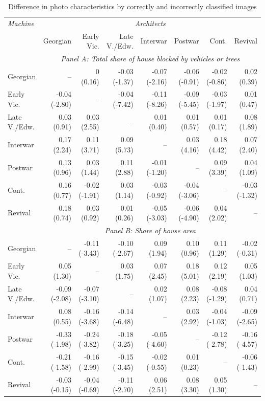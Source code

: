 \documentclass[]{article}
\begin{document}
\begin{table}[!htb] 
\caption{Difference in photo characteristics by correctly and incorrectly classified images} 
\label{tab:diffimgchar} 
\centering 
\begingroup\scriptsize 
\begin{tabular}{lrrrrrrr}

\toprule 

\emph{Machine} & \multicolumn{7}{c}{\emph{Architects}} \\ 
  \cmidrule(lr){2-8} 
& Georgian & Early Vic. & Late V./Edw. & Interwar & Postwar & Cont. & Revival \\  

 \cmidrule(lr){2-8} 
 & \multicolumn{7}{c}{\emph{ Panel A: Total share of house blocked by vehicles or trees}}\\ 
\cmidrule(lr){1-1} \cmidrule(lr){2-8} 

Georgian &  -- &  0 (0.16) & -0.03 (-1.37) & -0.07 (-2.16) & -0.06 (-0.91) & -0.02 (-0.86) &  0.02 (0.39) \\  
  Early Vic. & -0.04 (-2.80) &  -- & -0.04 (-7.42) & -0.11 (-8.26) & -0.09 (-5.45) & -0.03 (-1.97) &  0.01 (0.47) \\  
  Late V./Edw. &  0.03 (0.91) &  0.03 (2.55) &  -- &  0.01 (0.40) &  0.01 (0.57) &  0.01 (0.17) &  0.08 (1.89) \\  
  Interwar &  0.17 (2.24) &  0.11 (3.71) &  0.09 (5.73) &  -- &  0.03 (4.16) &  0.18 (4.42) &  0.07 (2.40) \\  
  Postwar &  0.13 (0.96) &  0.03 (1.44) &  0.11 (2.88) & -0.01 (-1.20) &  -- &  0.09 (3.39) &  0.04 (1.09) \\  
  Cont. &  0.16 (0.77) & -0.02 (-1.91) &  0.03 (1.14) & -0.03 (-0.92) & -0.04 (-3.06) &  -- & -0.03 (-1.32) \\  
  Revival &  0.18 (0.74) &  0.03 (0.92) &  0.01 (0.26) & -0.05 (-3.03) & -0.06 (-4.90) &  0.04 (2.02) &  -- \\  

\cmidrule(lr){1-1} \cmidrule(lr){2-8} 
 & \multicolumn{7}{c}{\emph{ Panel B: Share of house area}}\\ 
\cmidrule(lr){1-1} \cmidrule(lr){2-8} 

  Georgian &  -- & -0.11 (-3.43) & -0.10 (-2.67) &  0.09 (1.94) &  0.10 (0.96) &  0.11 (1.29) & -0.02 (-0.31) \\  
  Early Vic. &  0.05 (1.30) &  -- &  0.03 (1.75) &  0.07 (2.45) &  0.18 (5.01) &  0.12 (2.19) &  0.05 (1.03) \\  
  Late V./Edw. & -0.09 (-2.08) & -0.07 (-3.10) &  -- &  0.02 (1.07) &  0.08 (2.23) & -0.08 (-1.29) &  0.04 (0.71) \\  
  Interwar &  0.08 (0.55) & -0.16 (-3.68) & -0.14 (-6.48) &  -- &  0.03 (2.92) & -0.04 (-1.03) & -0.09 (-2.65) \\  
  Postwar & -0.33 (-1.98) & -0.24 (-3.82) & -0.18 (-3.25) & -0.05 (-4.60) &  -- & -0.12 (-2.78) & -0.16 (-4.57) \\  
  Cont. & -0.21 (-1.58) & -0.16 (-2.99) & -0.15 (-3.45) & -0.02 (-0.55) &  0.01 (0.23) &  -- & -0.06 (-1.43) \\  
  Revival & -0.03 (-0.15) & -0.04 (-0.69) & -0.11 (-2.70) &  0.06 (2.51) &  0.08 (3.30) &  0.05 (1.30) &  -- \\  


\end{tabular}
\end{table}
\end{document}
